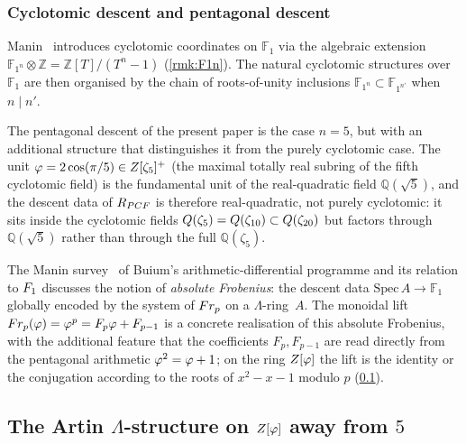 \subsubsection{Cyclotomic descent and pentagonal descent}
\label{ssec:cyclotomic}

Manin~\cite{manin08} introduces cyclotomic coordinates on
$\mathbb{F}_1$ via the algebraic
extension~$\mathbb{F}_{1^n}\otimes\mathbb{Z} = \mathbb{Z}[T]/(T^n-1)$
\textup{(\cref{rmk:F1n})}.  The natural cyclotomic
structures over $\mathbb{F}_1$ are then organised by the chain of
roots-of-unity inclusions
$\mathbb{F}_{1^n} \subset \mathbb{F}_{1^{n'}}$ when $n\mid n'$.

The pentagonal descent of the present paper is the case $n=5$,
but with an additional structure that distinguishes it from the
purely cyclotomic case.  The unit
$\varphi = 2\cos(\pi/5) \in Z[\zeta_5]^+$
\textup{(}the maximal totally real subring of the fifth
cyclotomic field\textup{)} is the fundamental unit of the
real-quadratic field $\mathbb{Q}(\sqrt{5})$, and the descent
data of $R_{PCF}$ is therefore real-quadratic, not purely
cyclotomic: it sits inside the cyclotomic fields
$Q(\zeta_5)=Q(\zeta_{10})\subset Q(\zeta_{20})$ but factors through
$\mathbb{Q}(\sqrt{5})$ rather than through the full
$\mathbb{Q}(\zeta_5)$.

\begin{remark}\label{rmk:absolute-frobenius}
The Manin survey~\cite{manin13} of Buium's arithmetic-differential programme and its relation to $F_1$ discusses the notion of
\emph{absolute Frobenius}: the descent data
$\mathrm{Spec}\,A\to\mathbb{F}_1$ globally encoded by the system
of $Fr_p$ on a $\Lambda$-ring~$A$.  The monoidal lift
$Fr_p(\varphi) = \varphi^p = F_p\varphi + F_{p-1}$ is a concrete
realisation of this absolute Frobenius, with the additional
feature that the coefficients
$F_p, F_{p-1}$ are read directly from the pentagonal arithmetic
$\varphi^2 = \varphi + 1$; on the ring $Z[\varphi]$ the lift is the identity or the
conjugation according to the roots of $x^2-x-1$ modulo $p$ (\cref{sec:lambda-ring}).
\end{remark}

\subsection{The Artin $\Lambda$-structure on $Z[\varphi]$ away from $5$}\label{sec:lambda-ring}

